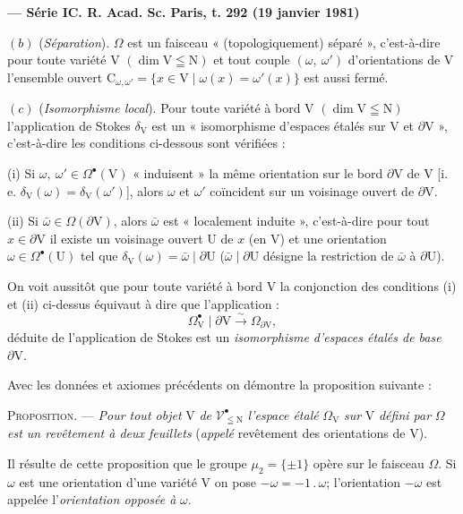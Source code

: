 \textbf{--- Série I\hfill C. R. Acad. Sc. Paris, t. 292 (19 janvier 1981)}

$(b)$ (\textit{Séparation}). $\Omega$ est un faisceau « (topologiquement) séparé », c'est-à-dire pour toute variété $\mathrm{V}$ $(\dim\mathrm{V}\leqq\mathrm{N})$ et tout couple $(\omega,\ \omega')$ d'orientations de $\mathrm{V}$ l'ensemble ouvert $\mathrm{C}_{\omega,\omega'}=\{x\in\mathrm{V}\mid\omega(x)=\omega'(x)\}$ est aussi fermé.

$(c)$ (\textit{Isomorphisme local}). Pour toute variété à bord $\mathrm{V}$ $(\dim\mathrm{V}\leqq\mathrm{N})$ l'application de Stokes $\delta_{\mathrm{V}}$ est un « isomorphisme d'espaces étalés sur $\mathrm{V}$ et $\partial\mathrm{V}$ », c'est-à-dire les conditions ci-dessous sont vérifiées :

(i) Si $\omega,\ \omega'\in\Omega^{\bullet}(\mathrm{V})$ « induisent » la même orientation sur le bord $\partial\mathrm{V}$ de $\mathrm{V}$ [i. e. $\delta_{\mathrm{V}}(\omega)=\delta_{\mathrm{V}}(\omega')$], alors $\omega$ et $\omega'$ coïncident sur un voisinage ouvert de $\partial\mathrm{V}$.

(ii) Si $\bar{\omega}\in\Omega(\partial\mathrm{V})$, alors $\bar{\omega}$ est « localement induite », c'est-à-dire pour tout $x\in\partial\mathrm{V}$ il existe un voisinage ouvert $\mathrm{U}$ de $x$ (en $\mathrm{V}$) et une orientation $\omega\in\Omega^{\bullet}(\mathrm{U})$ tel que $\delta_{\mathrm{V}}(\omega)=\bar{\omega}\mid\partial\mathrm{U}$ ($\bar{\omega}\mid\partial\mathrm{U}$ désigne la restriction de $\bar{\omega}$ à $\partial\mathrm{U}$).

On voit aussitôt que pour toute variété à bord $\mathrm{V}$ la conjonction des conditions (i) et (ii) ci-dessus équivaut à dire que l'application :
\[
\Omega^{\bullet}_{\mathrm{V}}\mid\partial\mathrm{V}\overset{\sim}{\to}\Omega_{\partial\mathrm{V}},
\]
déduite de l'application de Stokes est un \textit{isomorphisme d'espaces étalés de base} $\partial\mathrm{V}$.

Avec les données et axiomes précédents on démontre la proposition suivante :

\textsc{Proposition}. --- \textit{Pour tout objet} $\mathrm{V}$ \textit{de} $\mathscr{V}^{\bullet}_{\leqq\mathrm{N}}$ \textit{l'espace étalé} $\Omega_{\mathrm{V}}$ \textit{sur} $\mathrm{V}$ \textit{défini par} $\Omega$ \textit{est un revêtement à deux feuillets} (\textit{appelé} revêtement des orientations de $\mathrm{V}$).

Il résulte de cette proposition que le groupe $\mu_2=\{\pm1\}$ opère sur le faisceau $\Omega$. Si $\omega$ est une orientation d'une variété $\mathrm{V}$ on pose $-\omega=-1\,.\,\omega$; l'orientation $-\omega$ est appelée l'\textit{orientation opposée à} $\omega$.

